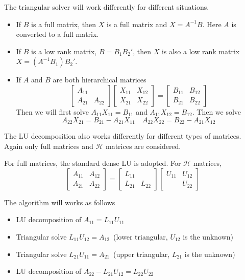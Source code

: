 \documentclass[3p,,preprint,12pt]{elsarticle}
\theoremstyle{definition}
\begin{document}
The triangular solver will work differently for different situations.
\begin{itemize}
	\item If $B$ is a full matrix, then $X$ is a full matrix and $X=A^{-1}B$. Here $A$ is converted to a full matrix.
	\item If $B$ is a low rank matrix, $B=B_1B_2'$, then $X$ is also a low rank matrix $X = (A^{-1}B_1)B_2'$.
	\item If $A$ and $B$ are both hierarchical matrices
	\[\left[ {\begin{array}{*{20}{c}}
{{A_{11}}}&{}\\
{{A_{21}}}&{{A_{22}}}
\end{array}} \right]\left[ {\begin{array}{*{20}{c}}
{{X_{11}}}&{{X_{12}}}\\
{{X_{21}}}&{{X_{22}}}
\end{array}} \right] = \left[ {\begin{array}{*{20}{c}}
{{B_{11}}}&{{B_{12}}}\\
{{B_{21}}}&{{B_{22}}}
\end{array}} \right]\]
Then we will first solve $A_{11}X_{11}=B_{11}$ and $A_{11}X_{12}=B_{12}$. Then we solve
\begin{equation}
	A_{22}X_{21} = B_{21}-A_{21}X_{11}\quad A_{22}X_{22} = B_{22}-A_{21}X_{12}
\end{equation}	
\end{itemize}

The LU decomposition also works differently for different types of matrices. Again only full matrices and $\mathcal{H}$ matrices are considered. 

For full matrices, the standard dense LU is adopted. For $\mathcal{H}$ matrices, 
\[\left[ {\begin{array}{*{20}{c}}
{{A_{11}}}&{{A_{12}}}\\
{{A_{21}}}&{{A_{22}}}
\end{array}} \right] = \left[ {\begin{array}{*{20}{c}}
{{L_{11}}}&\\
{{L_{21}}}&{{L_{22}}}
\end{array}} \right]\left[ {\begin{array}{*{20}{c}}
{{U_{11}}}&{{U_{12}}}\\
{}&{{U_{22}}}
\end{array}} \right]\]

The algorithm will works as follows
\begin{itemize}
	\item LU decomposition of $A_{11}=L_{11}U_{11}$
	\item Triangular solve $L_{11}U_{12}=A_{12}$~(lower triangular, $U_{12}$ is the unknown)
	\item Triangular solve $L_{21}U_{11} = A_{21}$~(upper triangular, $L_{21}$ is the unknown)
	\item LU decomposition of $A_{22}-L_{21}U_{12}=L_{22}U_{22}$
\end{itemize}	
\end{document}
